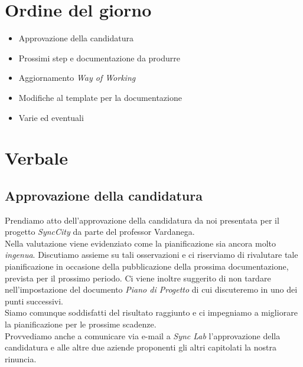 \documentclass[italian,12pt]{article} %
\begin{document}
\section{Ordine del giorno}
\begin{itemize}
	\itemsep0em
	\item Approvazione della candidatura
	\item Prossimi step e documentazione da produrre
	\item Aggiornamento \textit{Way of Working}
	\item Modifiche al template per la documentazione
	\item Varie ed eventuali
\end{itemize}

\newpage

\section{Verbale}

\subsection{Approvazione della candidatura}
Prendiamo atto dell'approvazione della candidatura da noi presentata per il progetto \textit{SyncCity} da parte del professor Vardanega. \\
Nella valutazione viene evidenziato come la pianificazione sia ancora molto \textit{ingenua}. Discutiamo assieme su tali osservazioni e ci riserviamo di rivalutare tale pianificazione in occasione della pubblicazione della prossima documentazione, prevista per il prossimo periodo. Ci viene inoltre suggerito di non tardare nell'impostazione del documento \textit{Piano di Progetto} di cui discuteremo in uno dei punti successivi. \\
Siamo comunque soddisfatti del risultato raggiunto e ci impegniamo a migliorare la pianificazione per le prossime scadenze. \\
Provvediamo anche a comunicare via e-mail a \textit{Sync Lab} l'approvazione della candidatura e alle altre due aziende proponenti gli altri capitolati la nostra rinuncia.
\end{document}
